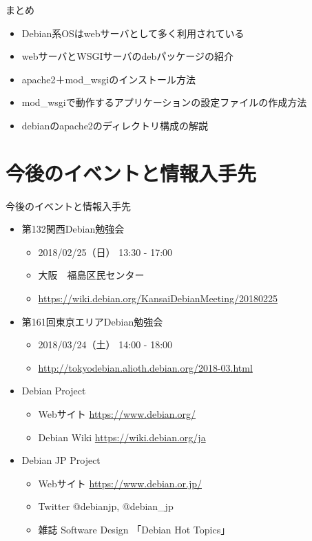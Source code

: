 \begin{frame}[containsverbatim]{まとめ}

  \begin{itemize}
  \item Debian系OSはwebサーバとして多く利用されている
  \item webサーバとWSGIサーバのdebパッケージの紹介
  \item apache2＋mod\_wsgiのインストール方法
  \item mod\_wsgiで動作するアプリケーションの設定ファイルの作成方法
  \item debianのapache2のディレクトリ構成の解説
  \end{itemize}

\end{frame}


\section{今後のイベントと情報入手先}

\begin{frame}{今後のイベントと情報入手先}

  \begin{itemize}
  \item 第132関西Debian勉強会
    \begin{itemize}
      \item 2018/02/25（日） 13:30 - 17:00
      \item 大阪　福島区民センター
      \item \url{https://wiki.debian.org/KansaiDebianMeeting/20180225}
    \end{itemize}
    
  \item 第161回東京エリアDebian勉強会
    \begin{itemize}
      \item 2018/03/24（土） 14:00 - 18:00
      \item \url{http://tokyodebian.alioth.debian.org/2018-03.html}
    \end{itemize}

  \item Debian Project
    \begin{itemize}
    \item Webサイト \url{https://www.debian.org/}
    \item Debian Wiki \url{https://wiki.debian.org/ja}
    \end{itemize}
        
  \item Debian JP Project
    \begin{itemize}
      \item Webサイト \url{https://www.debian.or.jp/}
      \item Twitter @debianjp, @debian\_jp
      \item 雑誌 Software Design 「Debian Hot Topics」
    \end{itemize}
  \end{itemize}

\end{frame}




